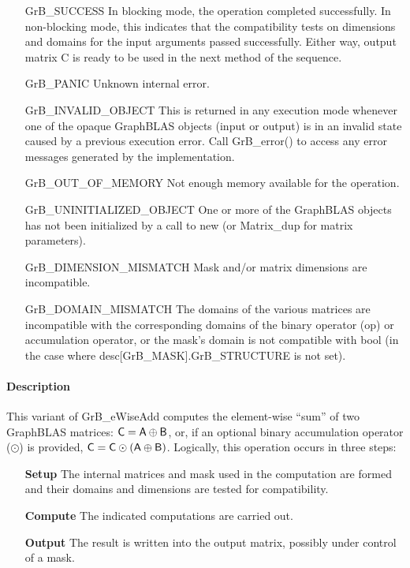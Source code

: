 \begin{itemize}[leftmargin=2.1in]
    \item[{\sf GrB\_SUCCESS}]         In blocking mode, the operation completed
    successfully. In non-blocking mode, this indicates that the compatibility 
    tests on dimensions and domains for the input arguments passed successfully. 
    Either way, output matrix {\sf C} is ready to be used in the next method of
    the sequence.

    \item[{\sf GrB\_PANIC}]           Unknown internal error.

    \item[{\sf GrB\_INVALID\_OBJECT}] This is returned in any execution mode 
    whenever one of the opaque GraphBLAS objects (input or output) is in an invalid 
    state caused by a previous execution error.  Call {\sf GrB\_error()} to access 
    any error messages generated by the implementation.

    \item[{\sf GrB\_OUT\_OF\_MEMORY}] Not enough memory available for the operation.

    \item[{\sf GrB\_UNINITIALIZED\_OBJECT}] One or more of the GraphBLAS objects 
    has not been initialized by a call to {\sf new} (or {\sf Matrix\_dup} for matrix
    parameters).

    \item[{\sf GrB\_DIMENSION\_MISMATCH}] Mask and/or matrix
    dimensions are incompatible.

    \item[{\sf GrB\_DOMAIN\_MISMATCH}]    The domains of the various matrices are
    incompatible with the corresponding domains of the binary operator ({\sf op}) or
    accumulation operator, or the mask's domain is not compatible with {\sf bool}
    (in the case where {\sf desc[GrB\_MASK].GrB\_STRUCTURE} is not set).
\end{itemize}

\paragraph{Description}

This variant of {\sf GrB\_eWiseAdd } computes the element-wise ``sum'' of
two GraphBLAS matrices: ${\sf C} = {\sf A} \oplus {\sf B}$, or, if an optional
binary accumulation operator ($\odot$) is provided, ${\sf C} = {\sf C} \odot
\left({\sf A} \oplus {\sf B}\right)$.  Logically, this operation occurs in
three steps:
\begin{enumerate}[leftmargin=0.85in]
\item[\bf Setup] The internal matrices and mask used in the computation are formed 
and their domains and dimensions are tested for compatibility.
\item[\bf Compute] The indicated computations are carried out.
\item[\bf Output] The result is written into the output matrix, possibly under 
control of a mask.
\end{enumerate}

